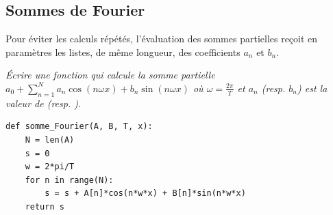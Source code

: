 \subsection{Sommes de Fourier}

Pour éviter les calculs répétés, l'évaluation des sommes partielles reçoit en paramètres les listes, de même longueur, des coefficients $a_n$ et $b_n$.
\begin{Exercise}\it
Écrire une fonction  qui calcule la somme partielle $\displaystyle  a_0 + \sum_{n=1}^{N} a_n\cos(n\omega x) + b_n\sin(n\omega x)$ où $\omega = \frac{2\pi}T$ et $a_n$ (resp. $b_n$) est la valeur de  (resp. ).
\end{Exercise}
\begin{Answer}
\begin{lstlisting}
def somme_Fourier(A, B, T, x):
    N = len(A)
    s = 0
    w = 2*pi/T
    for n in range(N):
        s = s + A[n]*cos(n*w*x) + B[n]*sin(n*w*x)
    return s
\end{lstlisting}
\end{Answer}
